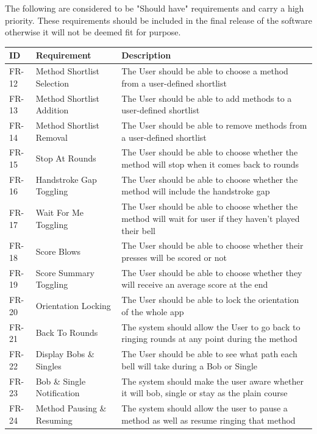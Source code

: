 \documentclass{l4proj}
\begin{document}
The following are considered to be "Should have" requirements and carry a high priority.  These requirements should be included in the final release of the software otherwise it will not be deemed fit for purpose.  

\begin{tabular}{| l |  p{4cm} | p{11cm} | }
\hline
\textbf{ID} & \textbf{Requirement} & \textbf{Description} \\
\hline
\hline

FR-12 & Method Shortlist Selection & The User should be able to choose a method from a user-defined shortlist \\
\hline
FR-13 & Method Shortlist Addition  & The User should be able to add methods to a user-defined shortlist \\
\hline
FR-14 & Method Shortlist Removal  & The User should be able to remove methods from a user-defined shortlist\\
\hline
FR-15 & Stop At Rounds & The User should be able to choose whether the method will stop when it comes back to rounds \\
\hline
FR-16 &  Handstroke Gap Toggling & The User should be able to choose whether the method will include the handstroke gap \\
\hline
FR-17 &  Wait For Me Toggling & The User should be able to choose whether the method will wait for user if they haven't played their bell \\
\hline
FR-18 & Score Blows & The User should be able to choose whether their presses will be scored or not \\
\hline
FR-19 & Score Summary Toggling & The User should be able to choose whether they will receive an average score at the end \\
\hline
FR-20 & Orientation Locking & The User should be able to lock the orientation of the whole app \\
\hline
FR-21 & Back To Rounds & The system should allow the User to go back to ringing rounds at any point during the method\\
\hline
FR-22 & Display Bobs \& Singles & The User should be able to see what path each bell will take during a Bob or Single\\
\hline
FR-23 & Bob \& Single Notification & The system should make the user aware whether it will bob, single or stay as the plain course\\
\hline
FR-24 & Method Pausing \& Resuming & The system should allow the user to pause a method as well as resume ringing that method\\
\hline
\end{tabular}
\end{document}
